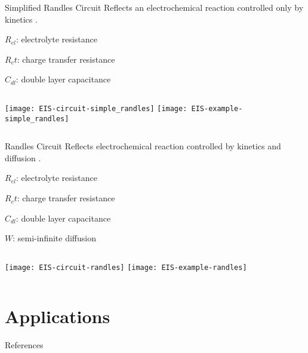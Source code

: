 \documentclass[10pt,compress,handout]{beamer}
\begin{document}
    \begin{frame}{Simplified Randles Circuit}
        Reflects an electrochemical reaction controlled only by kinetics \citep{lazanas2023}.

        $R_{el}$: electrolyte resistance

        $R_ct$: charge transfer resistance

        $C_{dl}$: double layer capacitance

        \begin{columns}
                \texttt{[image: EIS-circuit-simple\_randles]}
                \texttt{[image: EIS-example-simple\_randles]}
        \end{columns}
    \end{frame}

    \begin{frame}{Randles Circuit}
        Reflects electrochemical reaction controlled by kinetics and diffusion \citep{lazanas2023}.

        $R_{el}$: electrolyte resistance

        $R_ct$: charge transfer resistance

        $C_{dl}$: double layer capacitance

        $W$: semi-infinite diffusion
        \begin{columns}
                \texttt{[image: EIS-circuit-randles]}
                \texttt{[image: EIS-example-randles]}
        \end{columns}
        
    \end{frame}

\section{Applications}

\begin{frame}[allowframebreaks=0.9]{References}
\AtNextBibliography{\tiny}
\printbibliography
\end{frame}
\end{document}
